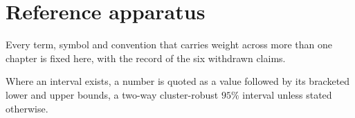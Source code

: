 %
%

\chapter*{Reference apparatus}
{}
\label{sec:howtoread}
\framedecl{-}

\begin{question}
Every term, symbol and convention that carries weight across more than one
chapter is fixed here, with the record of the six withdrawn claims.
\end{question}

\noindent
Where an interval exists, a number is quoted as a value followed by its
bracketed lower and upper bounds, a two-way cluster-robust $95\%$ interval
unless stated otherwise.

